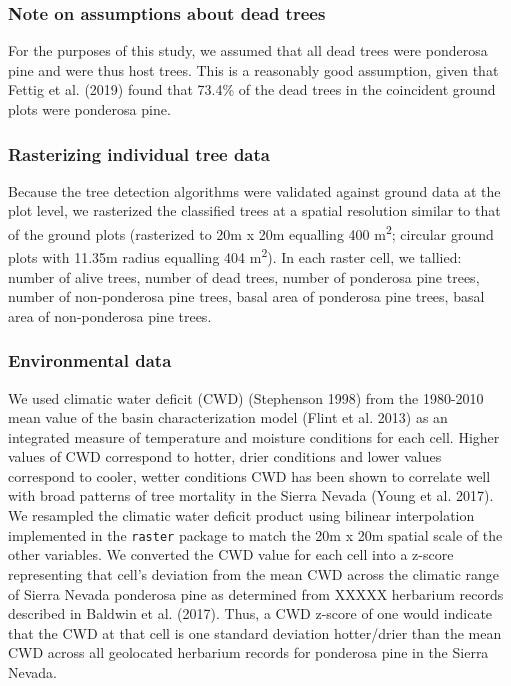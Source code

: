 \documentclass[]{article}
\begin{document}
\subsubsection{Note on assumptions about dead
trees}\label{note-on-assumptions-about-dead-trees}

For the purposes of this study, we assumed that all dead trees were
ponderosa pine and were thus host trees. This is a reasonably good
assumption, given that Fettig et al. (2019) found that 73.4\% of the
dead trees in the coincident ground plots were ponderosa pine.

\subsubsection{Rasterizing individual tree
data}\label{rasterizing-individual-tree-data}

Because the tree detection algorithms were validated against ground data
at the plot level, we rasterized the classified trees at a spatial
resolution similar to that of the ground plots (rasterized to 20m x 20m
equalling 400 m\textsuperscript{2}; circular ground plots with 11.35m
radius equalling 404 m\textsuperscript{2}). In each raster cell, we
tallied: number of alive trees, number of dead trees, number of
ponderosa pine trees, number of non-ponderosa pine trees, basal area of
ponderosa pine trees, basal area of non-ponderosa pine trees.

\subsubsection{Environmental data}\label{environmental-data}

We used climatic water deficit (CWD) (Stephenson 1998) from the
1980-2010 mean value of the basin characterization model (Flint et al.
2013) as an integrated measure of temperature and moisture conditions
for each cell. Higher values of CWD correspond to hotter, drier
conditions and lower values correspond to cooler, wetter conditions CWD
has been shown to correlate well with broad patterns of tree mortality
in the Sierra Nevada (Young et al. 2017). We resampled the climatic
water deficit product using bilinear interpolation implemented in the
\texttt{raster} package to match the 20m x 20m spatial scale of the
other variables. We converted the CWD value for each cell into a z-score
representing that cell's deviation from the mean CWD across the climatic
range of Sierra Nevada ponderosa pine as determined from XXXXX herbarium
records described in Baldwin et al. (2017). Thus, a CWD z-score of one
would indicate that the CWD at that cell is one standard deviation
hotter/drier than the mean CWD across all geolocated herbarium records
for ponderosa pine in the Sierra Nevada.
\end{document}
